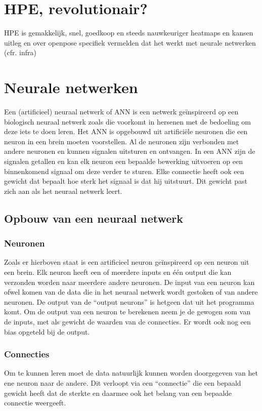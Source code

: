 \documentclass{article}
\begin{document}
\section{HPE, revolutionair?}
	HPE is gemakkelijk, snel, goedkoop en steeds nauwkeuriger
	heatmaps en kansen uitleg en over openpose specifiek
	vermelden dat het werkt met neurale netwerken (cfr. infra)

\section{Neurale netwerken}

Een (artificieel) neuraal netwerk of ANN is een netwerk geïnspireerd op een biologisch neuraal netwerk zoals die voorkomt in hersenen met de bedoeling om deze iets te doen leren. Het ANN is opgebouwd uit artificiële neuronen die een neuron in een brein moeten voorstellen. Al de neuronen zijn verbonden met andere neuronen en kunnen signalen uitsturen en ontvangen. In een ANN zijn de signalen getallen en kan elk neuron een bepaalde bewerking uitvoeren op een binnenkomend signaal om deze verder te sturen. Elke connectie heeft ook een gewicht dat bepaalt hoe sterk het signaal is dat hij uitstuurt. Dit gewicht past zich aan als het neuraal netwerk leert. 

\subsection{Opbouw van een neuraal netwerk}
\subsubsection{Neuronen}
Zoals er hierboven staat is een artificieel neuron geïnspireerd op een neuron uit een brein. Elk neuron heeft een of meerdere inputs en één output die kan verzonden worden naar meerdere andere neuronen. De input van een neuron kan ofwel komen van de data die in het neuraal netwerk wordt gestoken of van andere neuronen. De output van de “output neurons” is hetgeen dat uit het programma komt. Om de output van een neuron te berekenen neem je de gewogen som van de inputs, met als gewicht de waarden van de connecties. Er wordt ook nog een bias opgeteld bij de output.

\subsubsection{Connecties}
Om te kunnen leren moet de data natuurlijk kunnen worden doorgegeven van het ene neuron naar de andere. Dit verloopt via een “connectie” die een bepaald gewicht heeft dat de sterkte en daarmee ook het belang van een bepaalde connectie weergeeft.
\end{document}
